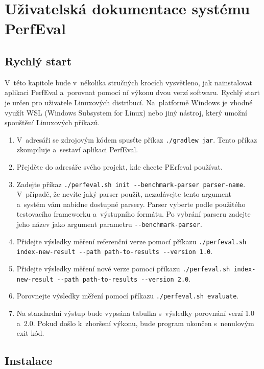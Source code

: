 \chapter{Uživatelská dokumentace systému PerfEval}

\section{Rychlý start}

V~této kapitole bude v~několika stručných krocích vysvětleno, jak nainstalovat aplikaci PerfEval a~porovnat pomocí
ní výkonu dvou verzí softwaru. Rychlý start je určen pro uživatele Linuxových distribucí. Na~platformě Windows je
vhodné využít WSL (Windows Subsystem for Linux) nebo jiný nástroj, který umožní spouštění Linuxových příkazů.

\begin{enumerate}
    \item V~adresáři se zdrojovým kódem spusťte příkaz \texttt{./gradlew jar}. Tento příkaz zkompiluje a~sestaví aplikaci PerfEval.
    \item Přejděte do adresáře svého projekt, kde chcete PErfeval používat.
    \item Zadejte příkaz \texttt{./perfeval.sh init -\--benchmark-parser parser-name}. \newline V~případě, že nevíte jaký parser použít, nezadávejte tento argument
        a~systém vám nabídne dostupné parsery. Parser vyberte podle použitého testovacího frameworku a~výstupního formátu.
        Po vybrání parseru zadejte jeho název jako argument parametru \texttt{-\--benchmark-parser}.
    \item Přidejte výsledky měření referenční verze pomocí příkazu \texttt{./perfeval.sh index-new-result -\--path path-to-results -\--version 1.0}.
    \item Přidejte výsledky měření nové verze pomocí příkazu \texttt{./perfeval.sh \newline index-new-result -\--path path-to-results -\--version 2.0}.
    \item Porovnejte výsledky měření pomocí příkazu \texttt{./perfeval.sh evaluate}.
    \item Na standardní výstup bude vypsána tabulka s~výsledky porovnání verzí 1.0 a~2.0. Pokud došlo k~zhoršení výkonu, bude program ukončen s~nenulovým exit kód.
    
\end{enumerate}


\section{Instalace}

